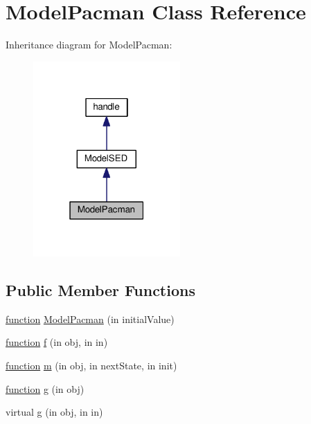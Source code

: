 \hypertarget{class_model_pacman}{}\section{Model\+Pacman Class Reference}
\label{class_model_pacman}


Inheritance diagram for Model\+Pacman\+:
\nopagebreak
\begin{figure}[H]
\begin{center}
\leavevmode
\includegraphics[width=159pt]{class_model_pacman__inherit__graph}
\end{center}
\end{figure}
\subsection*{Public Member Functions}
\begin{DoxyCompactItemize}
\item 
\hyperlink{_plan__desuma_functions__2_players_8m_ac2ffb26d6f42d3bbcd7847b0873403f4}{function} \hyperlink{class_model_pacman_aeece945de8fe29ca408290f87392ac3d}{Model\+Pacman} (in initial\+Value)
\item 
\hyperlink{_plan__desuma_functions__2_players_8m_ac2ffb26d6f42d3bbcd7847b0873403f4}{function} \hyperlink{class_model_pacman_a6f3b146c92a207e95690d08975e1e072}{f} (in obj, in in)
\item 
\hyperlink{_plan__desuma_functions__2_players_8m_ac2ffb26d6f42d3bbcd7847b0873403f4}{function} \hyperlink{class_model_pacman_a3140f24c6c4b80037b7d4f521c6ae2d3}{m} (in obj, in next\+State, in init)
\item 
\hyperlink{_plan__desuma_functions__2_players_8m_ac2ffb26d6f42d3bbcd7847b0873403f4}{function} \hyperlink{class_model_pacman_a07dadfabe92bf9a144b8a862720e7746}{g} (in obj)
\item 
virtual \hyperlink{class_model_s_e_d_a2d53b5f665cfcf64d482bbfa8a6eb098}{g} (in obj, in in)
\end{DoxyCompactItemize}
